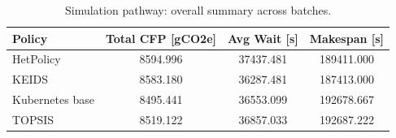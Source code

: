 \begin{table}[h!]
  \centering
  \renewcommand{\arraystretch}{1.12}
  \caption{Simulation pathway: overall summary across batches.}
  \label{tab:sim-overall}
  \small
  \begin{tabular}{lccc}
  \toprule
  Policy & Total CFP [gCO2e] & Avg Wait [s] & Makespan [s] \\
  \midrule
  HetPolicy & 8594.996 & 37437.481 & 189411.000 \\
  KEIDS & 8583.180 & 36287.481 & 187413.000 \\
  Kubernetes base & 8495.441 & 36553.099 & 192678.667 \\
  TOPSIS & 8519.122 & 36857.033 & 192687.222 \\
  \bottomrule
  \end{tabular}
\end{table}
